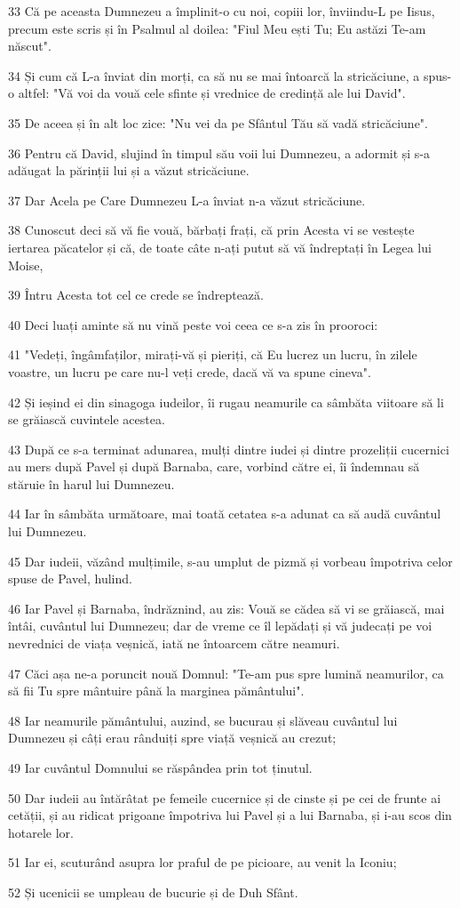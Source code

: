 \par 33 Că pe aceasta Dumnezeu a împlinit-o cu noi, copiii lor, înviindu-L pe Iisus, precum este scris și în Psalmul al doilea: "Fiul Meu ești Tu; Eu astăzi Te-am născut".
\par 34 Și cum că L-a înviat din morți, ca să nu se mai întoarcă la stricăciune, a spus-o altfel: "Vă voi da vouă cele sfinte și vrednice de credință ale lui David".
\par 35 De aceea și în alt loc zice: "Nu vei da pe Sfântul Tău să vadă stricăciune".
\par 36 Pentru că David, slujind în timpul său voii lui Dumnezeu, a adormit și s-a adăugat la părinții lui și a văzut stricăciune.
\par 37 Dar Acela pe Care Dumnezeu L-a înviat n-a văzut stricăciune.
\par 38 Cunoscut deci să vă fie vouă, bărbați frați, că prin Acesta vi se vestește iertarea păcatelor și că, de toate câte n-ați putut să vă îndreptați în Legea lui Moise,
\par 39 Întru Acesta tot cel ce crede se îndreptează.
\par 40 Deci luați aminte să nu vină peste voi ceea ce s-a zis în prooroci:
\par 41 "Vedeți, îngâmfaților, mirați-vă și pieriți, că Eu lucrez un lucru, în zilele voastre, un lucru pe care nu-l veți crede, dacă vă va spune cineva".
\par 42 Și ieșind ei din sinagoga iudeilor, îi rugau neamurile ca sâmbăta viitoare să li se grăiască cuvintele acestea.
\par 43 După ce s-a terminat adunarea, mulți dintre iudei și dintre prozeliții cucernici au mers după Pavel și după Barnaba, care, vorbind către ei, îi îndemnau să stăruie în harul lui Dumnezeu.
\par 44 Iar în sâmbăta următoare, mai toată cetatea s-a adunat ca să audă cuvântul lui Dumnezeu.
\par 45 Dar iudeii, văzând mulțimile, s-au umplut de pizmă și vorbeau împotriva celor spuse de Pavel, hulind.
\par 46 Iar Pavel și Barnaba, îndrăznind, au zis: Vouă se cădea să vi se grăiască, mai întâi, cuvântul lui Dumnezeu; dar de vreme ce îl lepădați și vă judecați pe voi nevrednici de viața veșnică, iată ne întoarcem către neamuri.
\par 47 Căci așa ne-a poruncit nouă Domnul: "Te-am pus spre lumină neamurilor, ca să fii Tu spre mântuire până la marginea pământului".
\par 48 Iar neamurile pământului, auzind, se bucurau și slăveau cuvântul lui Dumnezeu și câți erau rânduiți spre viață veșnică au crezut;
\par 49 Iar cuvântul Domnului se răspândea prin tot ținutul.
\par 50 Dar iudeii au întărâtat pe femeile cucernice și de cinste și pe cei de frunte ai cetății, și au ridicat prigoane împotriva lui Pavel și a lui Barnaba, și i-au scos din hotarele lor.
\par 51 Iar ei, scuturând asupra lor praful de pe picioare, au venit la Iconiu;
\par 52 Și ucenicii se umpleau de bucurie și de Duh Sfânt.

